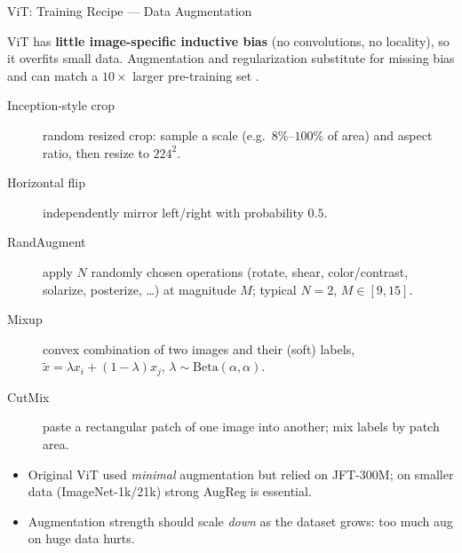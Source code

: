 \begin{frame}{ViT: Training Recipe --- Data Augmentation}

  ViT has \textbf{little image-specific inductive bias} (no convolutions, no locality), so it overfits small data. Augmentation and regularization substitute for missing bias and can match a $10\times$ larger pre-training set \cite{steiner2022augreg}.

  \vspace{0.4em}
  \begin{description}
    \item[Inception-style crop] random resized crop: sample a scale (e.g.\ $8\%$--$100\%$ of area) and aspect ratio, then resize to $224^2$.
    \item[Horizontal flip] independently mirror left/right with probability $0.5$.
    \item[RandAugment] apply $N$ randomly chosen operations (rotate, shear, color/contrast, solarize, posterize, \dots) at magnitude $M$; typical $N{=}2$, $M{\in}[9,15]$.
    \item[Mixup] convex combination of two images and their (soft) labels, $\tilde{x}=\lambda x_i + (1{-}\lambda) x_j$, $\lambda \sim \mathrm{Beta}(\alpha,\alpha)$.
    \item[CutMix] paste a rectangular patch of one image into another; mix labels by patch area.
  \end{description}

  \vspace{0.3em}
  \begin{itemize}
    \item Original ViT used \emph{minimal} augmentation but relied on JFT-300M; on smaller data (ImageNet-1k/21k) strong AugReg is essential.
    \item Augmentation strength should scale \emph{down} as the dataset grows: too much aug on huge data hurts.
  \end{itemize}
\end{frame}

